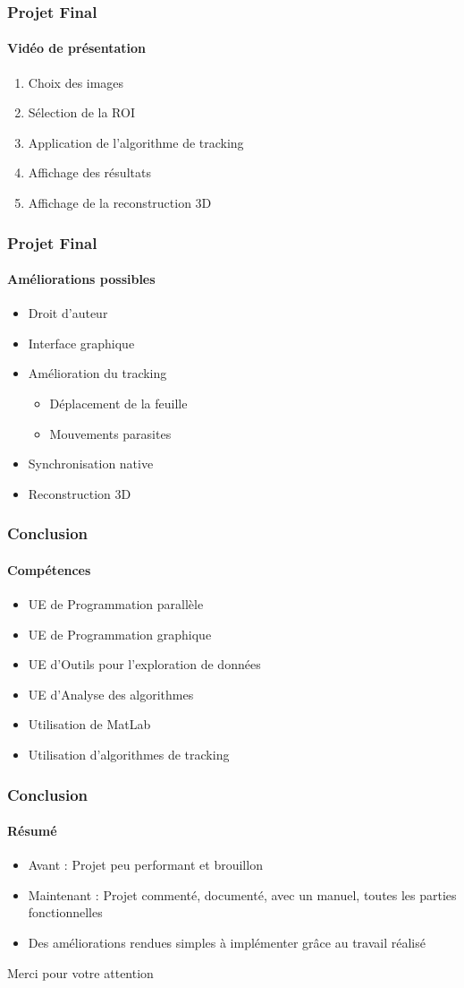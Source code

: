\documentclass[12pt]{beamer}
\begin{document}
\begin{frame}
\frametitle{Projet Final}
\framesubtitle{Vidéo de présentation}
\begin{enumerate}
\item Choix des images
\item Sélection de la ROI
\item Application de l'algorithme de tracking
\item Affichage des résultats
\item Affichage de la reconstruction 3D
\end{enumerate}
\end{frame}

\begin{frame}
\frametitle{Projet Final}
\framesubtitle{Améliorations possibles}
\begin{itemize}
\item Droit d'auteur
\item Interface graphique
\item Amélioration du tracking
\begin{itemize}
\item Déplacement de la feuille
\item Mouvements parasites
\end{itemize}
\item Synchronisation native
\item Reconstruction 3D
\end{itemize}
\end{frame}

\begin{frame}
\frametitle{Conclusion}
\framesubtitle{Compétences}
\begin{itemize}
\item UE de Programmation parallèle
\item UE de Programmation graphique
\item UE d'Outils pour l'exploration de données
\item UE d'Analyse des algorithmes
\item Utilisation de MatLab
\item Utilisation d'algorithmes de tracking
\end{itemize}
\end{frame}

\begin{frame}
\frametitle{Conclusion}
\framesubtitle{Résumé}
\begin{itemize}
\item Avant : Projet peu performant et brouillon
\item Maintenant : Projet commenté, documenté, avec un manuel, toutes les parties fonctionnelles
\item Des améliorations rendues simples à implémenter grâce au travail réalisé
\end{itemize}
\end{frame}

\begin{frame}
\Huge{\centerline{Merci pour votre attention}}
\end{frame}
\end{document}

